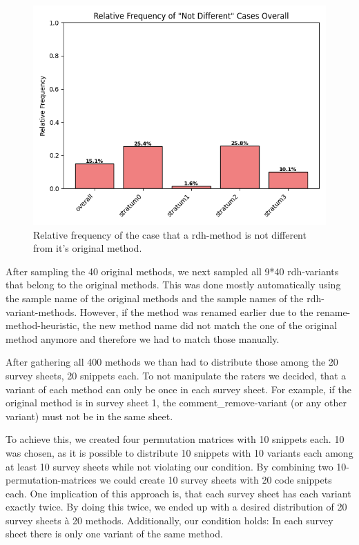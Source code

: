 \documentclass[%
class=scrreprt,
chapterprefix=false,%
open=right,%
twoside=false,%
paper=a4,%
logofile={Logo\_zentral\_farbig\_EN.png},%
thesistype=master,%
UKenglish,%
]{se2thesis}
\begin{document}
	\begin{figure}[t]
		\centering
		\includegraphics[width=\textwidth]{img/sampling_not_different_overall.png}
		\caption{Relative frequency of the case that a rdh-method is not different from it's original method.} 
		\label{fig:sampling_not_different_overall}
	\end{figure}
	
	After sampling the 40 original methods, we next sampled all 9*40 rdh-variants that belong to the original methods. This was done mostly automatically using the sample name of the original methods and the sample names of the rdh-variant-methods. However, if the method was renamed earlier due to the rename-method-heuristic, the new method name did not match the one of the original method anymore and therefore we had to match those manually.
	
	After gathering all 400 methods we than had to distribute those among the 20 survey sheets, 20 snippets each. To not manipulate the raters we decided, that a variant of each method can only be once in each survey sheet. For example, if the original method is in survey sheet 1, the comment\_remove-variant (or any other variant) must not be in the same sheet.
	
	To achieve this, we created four permutation matrices with 10 snippets each. 10 was chosen, as it is possible to distribute 10 snippets with 10 variants each among at least 10 survey sheets while not violating our condition. By combining two 10-permutation-matrices we could create 10 survey sheets with 20 code snippets each. One implication of this approach is, that each survey sheet has each variant exactly twice. By doing this twice, we ended up with a desired distribution of 20 survey sheets à 20 methods. Additionally, our condition holds: In each survey sheet there is only one variant of the same method.
	
\end{document}
